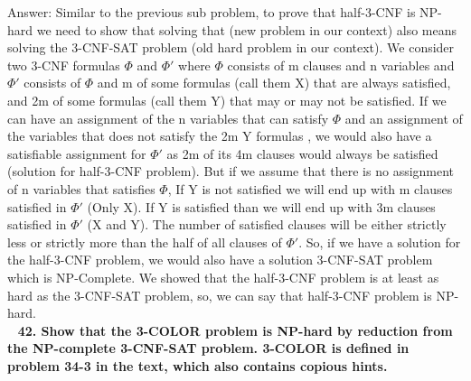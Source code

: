 \documentclass{article}
\begin{document}
Answer: Similar to the previous sub problem, to prove that half-3-CNF is NP-hard we need to show that solving that (new problem in our context) also means solving the 3-CNF-SAT problem (old hard problem in our context). We consider two 3-CNF formulas $\Phi$ and $\Phi'$ where $\Phi$ consists of m clauses and n variables and $\Phi'$ consists of $\Phi$ and m of some formulas (call them X) that are always satisfied, and 2m of some formulas (call them Y) that may or may not be satisfied. If we can have an assignment of the n variables that can satisfy $\Phi$ and an assignment of the variables that does not satisfy the 2m Y formulas , we would also have a satisfiable assignment for $\Phi'$ as 2m of its 4m clauses would always be satisfied (solution for half-3-CNF problem). But if we assume that there is no assignment of n variables that satisfies $\Phi$, If Y is not satisfied we will end up with m clauses satisfied in $\Phi'$ (Only X). If Y is satisfied than we will end up with 3m clauses satisfied in $\Phi'$ (X and Y). The number of satisfied clauses will be either strictly less or strictly more than the half of all clauses of $\Phi'$. So, if we  have a solution for the half-3-CNF problem, we would also have a solution 3-CNF-SAT problem which is NP-Complete. We showed that the half-3-CNF problem is at least as hard as the 3-CNF-SAT problem, so, we can say that half-3-CNF problem is NP-hard. \\ \newline
\textbf{42. Show that the 3-COLOR problem is NP-hard by reduction from the NP-complete 3-CNF-SAT problem. 3-COLOR is defined in problem 34-3 in the text, which also contains copious hints.}
\end{document}
